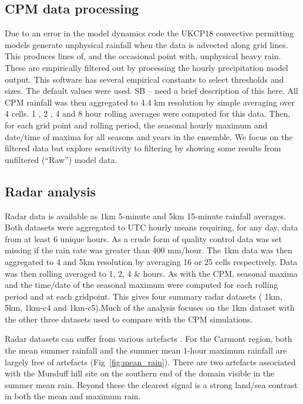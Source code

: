 \documentclass[11pt,a4paper]{article}
\begin{document}
\subsection{CPM data processing}

Due to an error in the model dynamics code the UKCP18 convective permitting models generate unphysical rainfall when the data is advected along grid lines. This produces lines of, and the occasional point with, unphysical heavy rain. These are empirically filtered out  by processing the hourly precipitation model output. This software has several empirical constants to select thresholds and sizes. The default values were used.  SB -- need a brief description of this here. 
 All CPM rainfall was then aggregated to 4.4 km resolution by simple averaging over 4 cells. 1 , 2 , 4  and 8 hour rolling averages were computed for this data. Then, for each grid point and rolling period,  the seasonal hourly maximum and date/time of maxima for all seasons and years in the ensemble. We focus on the filtered data but  explore sensitivity to filtering by showing some results from unfiltered (``Raw'') model data. 

\subsection{Radar analysis}
Radar data is available  as  1km 5-minute and 5km 15-minute rainfall averages.  Both datasets  were aggregated to UTC hourly means requiring, for any day, data from at least 6  unique hours. As a crude form of quality control data was set missing if the rain rate was greater than 400 mm/hour.  The 1km data was then aggregated to 4 and 5km resolution by averaging 16 or 25 cells respectively. Data was then rolling averaged to 1, 2, 4 \& hours. As with the CPM,  seasonal maxima and the time/date of the seasonal maximum were computed for each rolling period and at each gridpoint. This gives four summary radar datasets ( 1km, 5km,  1km-c4 and  1km-c5).Much of the analysis focuses on the 1km dataset with the  other three datasets used to compare with the CPM simulations. 

Radar datasets can suffer from various artefacts \parencite{artefacts}.
For the Carmont region, both the mean summer rainfall and the summer mean 1-hour maximum rainfall are largely free of artefacts (Fig~\ref{fig:mean_rain}). There are two artefacts associated with the Munduff hill site on the southern end of the domain visible in the summer mean rain. Beyond these the clearest signal is a strong land/sea contrast in both the mean and maximum rain. 
\end{document}
